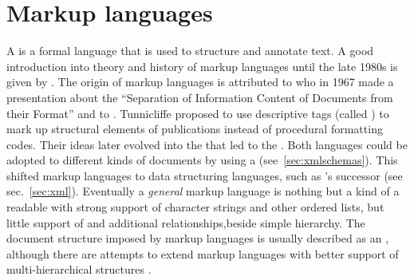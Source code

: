 \section{Markup languages}
\label{sec:markuplanguages}

A  is a formal language that is used to structure and
annotate text. A good introduction into theory and history of markup languages
until the late 1980s is given by \textcite{Coombs1987}. The origin of markup
languages is attributed to  who in 1967 made a
presentation about the ``Separation of Information Content of Documents from
their Format'' and to  \cite{Goldfarb1996}.  Tunnicliffe
proposed to use descriptive tags (called ) to mark up structural elements of publications instead of procedural
formatting codes. Their ideas later evolved into the  that led to the  \cite{Goldfarb1990}.  Both languages could be adopted to
different kinds of documents by using a  (see~\ref{sec:xmlschemas}).
This shifted markup languages to data structuring languages, such as
's successor  (see sec.~\ref{sec:xml}).  Eventually a
\emph{general} markup language is nothing but a kind of a readable  with strong support of character strings and other
ordered lists, but little support of  and
additional relationships,beside simple hierarchy.  The document structure
imposed by markup languages is usually described as an  \cite{DeRose1997,Renear1996}, although there are
attempts to extend markup languages with better support of multi-hierarchical
structures \cite{Pondorf2010}.

